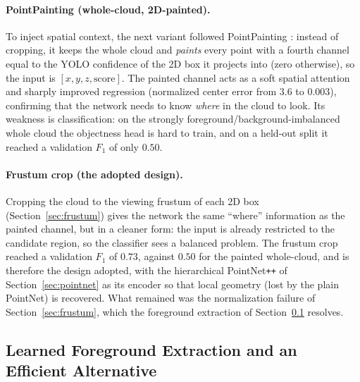 \paragraph*{PointPainting (whole-cloud, 2D-painted).} To inject spatial context,
the next variant followed PointPainting \cite{vora2020pointpainting}: instead of
cropping, it keeps the whole cloud and \emph{paints} every point with a fourth
channel equal to the YOLO confidence of the 2D box it projects into (zero
otherwise), so the input is $[x,y,z,\text{score}]$. The painted channel acts as a
soft spatial attention and sharply improved regression (normalized center
error from $3.6$ to $0.003$), confirming that the network needs to know
\emph{where} in the cloud to look. Its weakness is classification: on the strongly
foreground/background-imbalanced whole cloud the objectness head is hard to train,
and on a held-out split it reached a validation $F_1$ of only $0.50$.

\paragraph*{Frustum crop (the adopted design).} Cropping the cloud to the viewing
frustum of each 2D box (Section~\ref{sec:frustum}) gives the network the same
``where'' information as the painted channel, but in a cleaner form: the input is
already restricted to the candidate region, so the classifier sees a balanced
problem. The frustum crop reached a validation $F_1$ of $0.73$, against $0.50$ for
the painted whole-cloud, and is therefore the design adopted, with the
hierarchical PointNet\texttt{++} of Section~\ref{sec:pointnet} as its encoder so
that local geometry (lost by the plain PointNet) is recovered. What remained was
the normalization failure of Section~\ref{sec:frustum}, which the foreground
extraction of Section~\ref{sec:segnet} resolves.

\subsection{Learned Foreground Extraction and an Efficient Alternative}
\label{sec:segnet}


